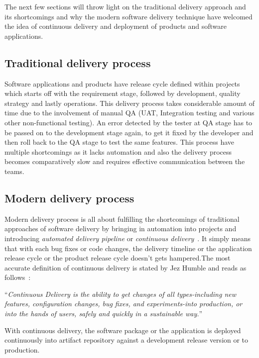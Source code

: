 The next few sections will throw light on the traditional delivery approach and its shortcomings and why the modern software delivery technique have welcomed the idea of continuous delivery and deployment of products and software applications. 


\subsection{Traditional delivery process}

Software applications and products have release cycle defined within projects which starts off with the requirement stage, followed by development, quality strategy and lastly operations. This delivery process takes considerable amount of time due to the involvement of manual QA (\ac{UAT}, Integration testing and various other non-functional testing). An error detected by the tester at QA stage has to be passed on to the development stage again, to get it fixed by the developer and then roll back to the QA stage to test the same features. This process have multiple shortcomings as it lacks automation and also the delivery process becomes comparatively slow and requires effective communication between the teams.

\subsection{Modern delivery process}

Modern delivery process is all about fulfilling the shortcomings of traditional approaches of software delivery by bringing in automation into projects and introducing \emph{automated delivery pipeline} or \emph{continuous delivery}~\parencite{leszko2017continuous}. It simply means that with each bug fixes or code changes, the delivery timeline or the application release cycle or the product release cycle doesn't gets hampered.The most accurate definition of continuous delivery is stated by Jez Humble and reads as follows~\parencite{leszko2017continuous}:
\vspace{0.5cm}


\enquote{\emph{Continuous Delivery is the ability to get changes of all types-including new features, configuration changes, bug fixes, and experiments-into production, or into the hands of users, safely and quickly in a sustainable way.}}


\vspace{0.5cm} 

With continuous delivery, the software package or the application is deployed continuously into artifact repository against a development release version or to production.


